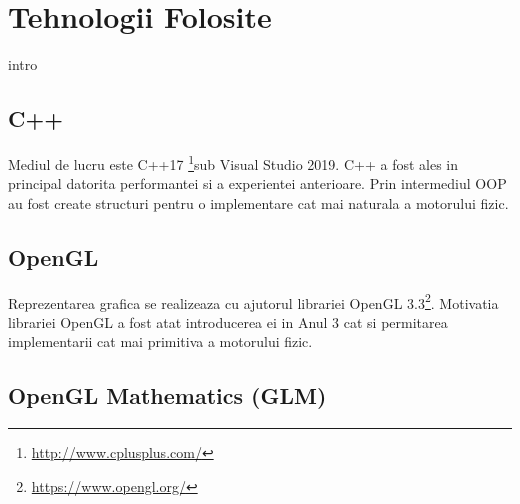 \chapter{Tehnologii Folosite}

intro

\section{C++}
 
Mediul de lucru este C++17 \footnote{\url{http://www.cplusplus.com/}}sub Visual Studio 2019. C++ a fost ales in principal datorita performantei si a experientei anterioare. Prin intermediul OOP au fost create structuri
pentru o implementare cat mai naturala a motorului fizic. 

\section{OpenGL}
 
Reprezentarea grafica se realizeaza cu ajutorul librariei OpenGL 3.3\footnote{\url{https://www.opengl.org/}}. Motivatia librariei OpenGL a fost atat introducerea ei in Anul 3 cat si permitarea implementarii cat mai primitiva a
motorului fizic.

\section{OpenGL Mathematics (GLM)}
 
